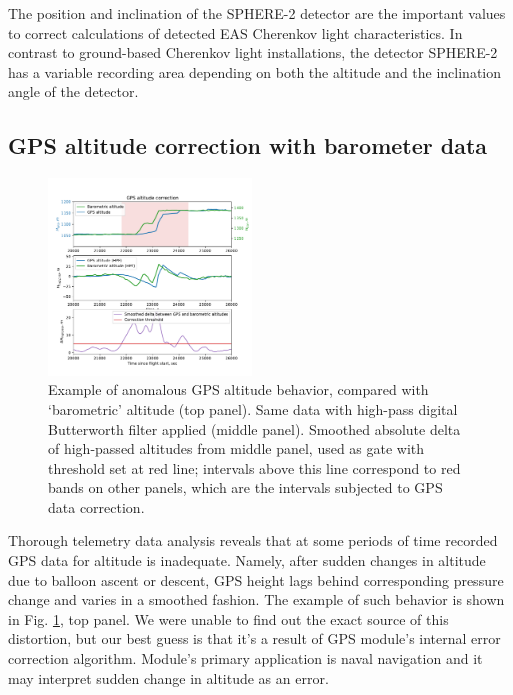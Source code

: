 \documentclass[final,5p,times,twocolumn]{elsarticle}
\begin{document}
The position and inclination of the SPHERE-2 detector are the important values to correct calculations of detected EAS Cherenkov light characteristics. In contrast to ground-based Cherenkov light installations, the detector SPHERE-2 has a variable recording area depending on both the altitude and the inclination angle of the detector.


\subsection{GPS altitude correction with barometer data}


\begin{figure}[tb]
    \includegraphics[width=0.48\textwidth]{figs/height_correction.pdf} 
    \caption{Example of anomalous GPS altitude behavior, compared with `barometric' altitude (top panel). Same data with high-pass digital Butterworth filter applied (middle panel). Smoothed absolute delta of high-passed altitudes from middle panel, used as gate with threshold set at red line; intervals above this line correspond to red bands on other panels, which are the intervals subjected to GPS data correction.}
\label{fig:h_corr}
\end{figure}

Thorough telemetry data analysis reveals that at some periods of time recorded GPS data for altitude is inadequate. Namely, after sudden changes in altitude due to balloon ascent or descent, GPS height lags behind corresponding pressure change and varies in a smoothed fashion. The example of such behavior is shown in Fig. \ref{fig:h_corr}, top panel. We were unable to find out the exact source of this distortion, but our best guess is that it's a result of GPS module's internal error correction algorithm. Module's primary application is naval navigation \cite{GPS-module-specs} and it may interpret sudden change in altitude as an error.
\end{document}
